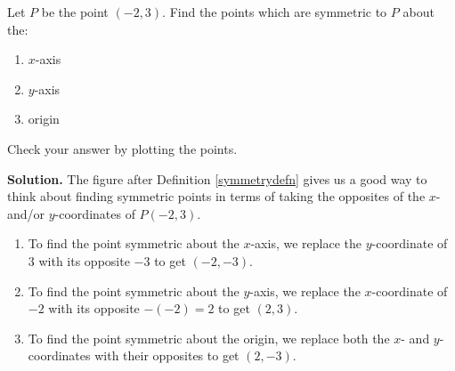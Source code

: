 \documentclass{ximera}
\begin{document}
\begin{example}  Let $P$ be the point $(-2,3)$.  Find the points which are symmetric to $P$ about the:

\begin{enumerate}

\item  $x$-axis

\item  $y$-axis

\item  origin

\end{enumerate}


Check your answer by plotting the points.

 

{\bf Solution.} The figure after Definition \ref{symmetrydefn} gives us a good way to think about finding symmetric points in terms of taking the opposites of the $x$- and/or $y$-coordinates of $P(-2,3)$.

\begin{enumerate}

\item  To find the point symmetric about the $x$-axis, we replace the $y$-coordinate of $3$ with its opposite $-3$ to get  $(-2,-3)$.

\item  To find the point symmetric about the $y$-axis, we replace the $x$-coordinate of $-2$ with its opposite $-(-2) = 2$ to get $(2,3)$.

\item  To find the point symmetric about the origin, we replace both the $x$- and $y$-coordinates with their opposites to get $(2,-3)$.

\end{enumerate}

\begin{center}
\end{center}
\end{example}
\end{document}

